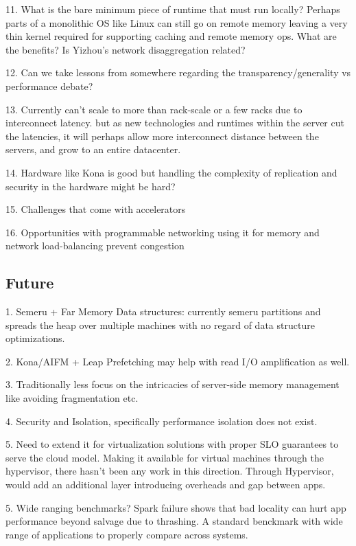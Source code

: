 11. What is the bare minimum piece of runtime that must run 
locally? Perhaps parts of a monolithic OS like Linux can 
still go on remote memory leaving a very thin kernel 
required for supporting caching and remote memory ops. 
What are the benefits? Is Yizhou's network disaggregation 
related?

12. Can we take lessons from somewhere regarding the 
transparency/generality vs performance debate?

13. Currently can't scale to more than rack-scale or a few 
racks due to interconnect latency. but 
as new technologies and runtimes within 
the server cut the latencies, it will perhaps 
allow more interconnect distance between the 
servers, and grow to an entire datacenter. 

14. Hardware like Kona is good but handling the
complexity of replication and security in the 
hardware might be hard?

15. Challenges that come with accelerators 

16. Opportunities with programmable networking
using it for memory and network load-balancing 
prevent congestion 

\subsection{Future}
1. Semeru + Far Memory Data structures: currently semeru 
partitions and spreads the heap over multiple machines 
with no regard of data structure optimizations. 

2. Kona/AIFM + Leap Prefetching may help with 
read I/O amplification as well.

3. Traditionally less focus on the intricacies of server-side 
memory management like avoiding fragmentation etc.

4. Security and Isolation, specifically performance isolation
does not exist. 


5. Need to extend it for virtualization solutions with 
proper SLO guarantees to serve the cloud model. 
Making it available for virtual machines through the 
hypervisor, there hasn't been any work in this direction.
Through Hypervisor, would add an additional layer 
introducing overheads and gap between apps. 


5. Wide ranging benchmarks? Spark failure shows that 
bad locality can hurt app performance beyond salvage due 
to thrashing. A standard benckmark with wide range of 
applications to properly compare across systems.